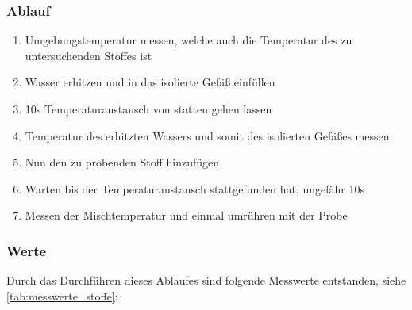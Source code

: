 \documentclass[11pt, ngerman]{scrartcl}
\begin{document}
\subsubsection{Ablauf}
\begin{enumerate}
    \item Umgebungstemperatur messen, welche auch die Temperatur des zu untersuchenden Stoffes ist
    \item Wasser erhitzen und in das isolierte Gefäß einfüllen
    \item 10s Temperaturaustausch von statten gehen lassen
    \item Temperatur des erhitzten Wassers und somit des isolierten Gefäßes messen
    \item Nun den zu probenden Stoff hinzufügen
    \item Warten bis der Temperaturaustausch stattgefunden hat; ungefähr 10s
    \item Messen der Mischtemperatur und einmal umrühren mit der Probe
\end{enumerate}

\subsubsection{Werte}
Durch das Durchführen dieses Ablaufes sind folgende Messwerte entstanden, siehe
\autoref{tab:messwerte_stoffe}:
\end{document}
